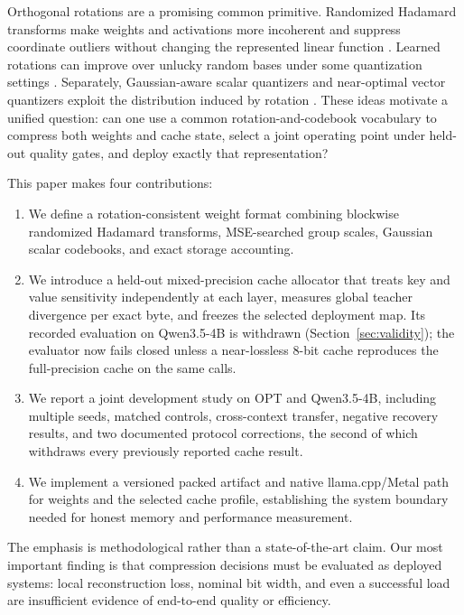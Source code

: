 \documentclass[10pt,twocolumn]{article}
\begin{document}
Orthogonal rotations are a promising common primitive. Randomized Hadamard
transforms make weights and activations more incoherent and suppress coordinate
outliers without changing the represented linear function
\cite{che2023quip,tseng2024quipsharp,ashkboos2024quarot}. Learned rotations can
improve over unlucky random bases under some quantization settings
\cite{liu2024spinquant}. Separately, Gaussian-aware scalar quantizers and
near-optimal vector quantizers exploit the distribution induced by rotation
\cite{dettmers2023qlora,zandieh2025turboquant}. These ideas motivate a unified
question: can one use a common rotation-and-codebook vocabulary to compress
both weights and cache state, select a joint operating point under held-out
quality gates, and deploy exactly that representation?

This paper makes four contributions:

\begin{enumerate}
  \item We define a rotation-consistent weight format combining blockwise
  randomized Hadamard transforms, MSE-searched group scales, Gaussian scalar
  codebooks, and exact storage accounting.
  \item We introduce a held-out mixed-precision cache allocator that treats key
  and value sensitivity independently at each layer, measures global teacher
  divergence per exact byte, and freezes the selected deployment map. Its
  recorded evaluation on Qwen3.5-4B is withdrawn (Section~\ref{sec:validity});
  the evaluator now fails closed unless a near-lossless 8-bit cache reproduces
  the full-precision cache on the same calls.
  \item We report a joint development study on OPT and Qwen3.5-4B, including
  multiple seeds, matched controls, cross-context transfer, negative recovery
  results, and two documented protocol corrections, the second of which
  withdraws every previously reported cache result.
  \item We implement a versioned packed artifact and native llama.cpp/Metal
  path for weights and the selected cache profile, establishing the system
  boundary needed for honest memory and performance measurement.
\end{enumerate}

The emphasis is methodological rather than a state-of-the-art claim. Our most
important finding is that compression decisions must be evaluated as deployed
systems: local reconstruction loss, nominal bit width, and even a successful
load are insufficient evidence of end-to-end quality or efficiency.
\end{document}
